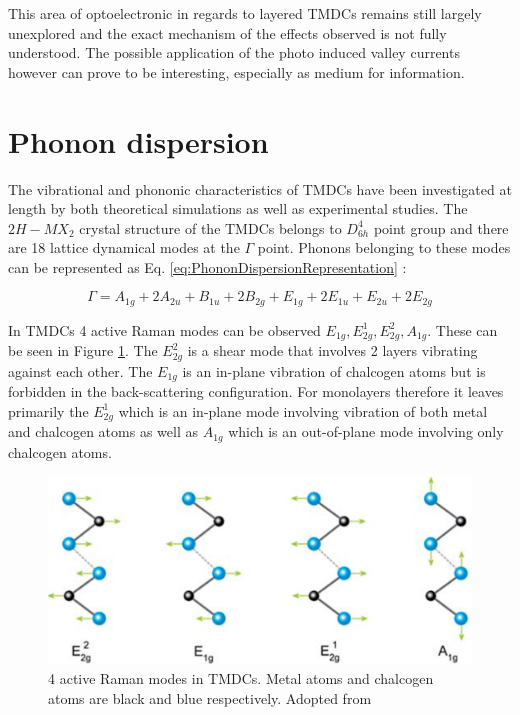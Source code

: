 This area of optoelectronic in regards to layered TMDCs remains still largely unexplored and the exact mechanism of the effects observed is not fully understood. The possible application of the photo induced valley currents however can prove to be interesting, especially as medium for information.

\section{Phonon dispersion}
	
The vibrational and phononic characteristics of TMDCs have been investigated at length by both theoretical simulations as well as experimental studies. The $2H-MX_2$ crystal structure of the TMDCs belongs to $D_{6h}^4$ point group and there are 18 lattice dynamical modes at the $\Gamma$ point. Phonons belonging to these modes can be represented as Eq. \ref{eq:PhononDispersionRepresentation} \cite{LatticeDynamicsInMono-AndFew-LayerSheetsOfWS2AndWSe2}: 
	
\begin{equation}
	{\Gamma} = A_{1g} + 2A_{2u} + B_{1u} + 2B_{2g} + E_{1g} + 2E_{1u} + E_{2u} + 2E_{2g}
	\label{eq:PhononDispersionRepresentation} 
\end{equation}
	
In TMDCs 4 active Raman modes can be observed $E_{1g}, E^1_{2g}, E^2_{2g}, A_{1g}$. These can be seen in Figure \ref{fig:4ActiveRamanModes}. The $E^2_{2g}$ is a shear mode that involves 2 layers vibrating against each other. The $E_{1g}$ is an in-plane vibration of chalcogen atoms but is forbidden in the back-scattering configuration. For monolayers therefore it leaves primarily the $E^1_{2g}$ which is an in-plane mode involving vibration of both metal and chalcogen atoms as well as $A_{1g}$ which is an out-of-plane mode involving only chalcogen atoms. 
	
\begin{figure}[h]
	\begin{center}
		\includegraphics[scale=0.2]{RamanActiveModes.png}
		\caption{4 active Raman modes in TMDCs. Metal atoms and chalcogen atoms are black and blue respectively. Adopted from \cite{LatticeDynamicsInMono-AndFew-LayerSheetsOfWS2AndWSe2}}
		\label{fig:4ActiveRamanModes}
	\end{center}
\end{figure}
	

